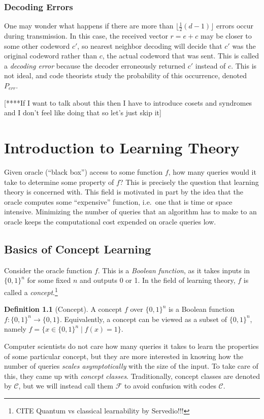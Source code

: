 \documentclass[12pt,twoside]{reedthesis}
\theoremstyle{definition}
\newtheorem{definition}[theorem]{Definition}
\begin{document}
\subsection{Decoding Errors}
One may wonder what happens if there are more than $\lfloor \frac{1}{2}(d-1)\rfloor$ errors occur during transmission. In this case, the received vector $r = e+c$ may be closer to some other codeword $c'$, so nearest neighbor decoding will decide that $c'$ was the original codeword rather than $c$, the actual codeword that was sent. This is called a \textit{decoding error} because the decoder erroneously returned $c'$ instead of $c$. This is not ideal, and code theorists study the probability of this occurrence, denoted $P_{err}$. 

[****If I want to talk about this then I have to introduce cosets and syndromes and I don't feel like doing that so let's just skip it]


\chapter{Introduction to Learning Theory}

Given oracle (``black box'') access to some function $f$, how many queries would it take to determine some property of $f$? This is precisely the question that learning theory is concerned with. This field is motivated in part by the idea that the oracle computes some ``expensive'' function, i.e.~one that is time or space intensive. Minimizing the number of queries that an algorithm has to make to an oracle keeps the computational cost expended on oracle queries low.

\section{Basics of Concept Learning}
Consider the oracle function $f$. This is a \textit{Boolean function}, as it takes inputs in $\{0,1\}^n$ for some fixed $n$ and outputs 0 or 1. In the field of learning theory, $f$ is called a \textit{concept}.\footnote{CITE Quantum vs classical learnability by Servedio!!!}

\begin{definition}[Concept] A concept $f$ over $\{0,1\}^n$ is a Boolean function $f: \{0,1\}^n \rightarrow \{0,1\}$. Equivalently, a concept can be viewed as a subset of $\{0,1\}^n$, namely $f = \{x \in \{0,1\}^n \mid f(x) = 1\}$.
\end{definition}

Computer scientists do not care how many queries it takes to learn the properties of some particular concept, but they are more interested in knowing how the number of queries \textit{scales asymptotically} with the size of the input. To take care of this, they came up with 
\textit{concept classes}. Traditionally, concept classes are denoted by $\mathcal{C}$, but we will instead call them $\mathcal{F}$ to avoid confusion with codes $\mathscr{C}$. 
\end{document}
